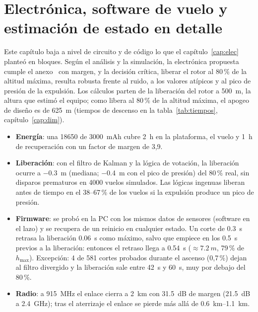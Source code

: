 \chapter[Electrónica y software de vuelo en detalle]{Electrónica, software de vuelo y estimación de estado en detalle}\label{cap:electronica}

Este capítulo baja a nivel de circuito y de código lo que el capítulo~\ref{cap:elec} planteó
en bloques. Según el análisis y la simulación, la electrónica propuesta cumple el
anexo~\cite{anexo} con margen, y la decisión crítica, liberar el rotor al 80\,\% de la
altitud máxima, resulta robusta frente al ruido, a los valores atípicos y al pico de presión
de la expulsión. Los cálculos parten de la liberación del rotor a \SI{500}{m}, la altura que
estimó el equipo; como  libera al 80\,\% de la altitud máxima, el apogeo de diseño es
de \SI{625}{m} (tiempos de descenso en la tabla~\ref{tab:tiempos}, capítulo~\ref{cap:dim}).

\begin{resultado}
\begin{itemize}[leftmargin=*]
  \item \textbf{Energía}: una 18650 de \SI{3000}{mAh} cubre \SI{2}{h} en la plataforma,
        el vuelo y \SI{1}{h} de recuperación con un factor de margen de 3,9.
  \item \textbf{Liberación}: con el filtro de Kalman y la lógica de votación, la liberación
        ocurre a \SI{-0.3}{m} (mediana; \SI{-0.4}{m} con el pico de presión) del 80\,\% real,
        sin disparos prematuros en \num{4000} vuelos simulados. Las lógicas ingenuas liberan
        antes de tiempo en el 38--67\,\% de los vuelos si la expulsión produce un pico de
        presión.
  \item \textbf{Firmware}: se probó en la PC con los mismos datos de sensores (software en el
        lazo) y se recupera de un reinicio en cualquier estado. Un corte de \SI{0.3}{s}
        retrasa la liberación \SI{0.06}{s} como máximo, salvo que empiece en los
        \SI{0.5}{s} previos a la liberación: entonces el retraso llega a \SI{0.54}{s}
        ($\approx\SI{7.2}{m}$, 79\,\% de $h_{\max}$). Excepción: 4 de 581 cortes probados
        durante el ascenso (0,7\,\%) dejan al filtro divergido y la liberación sale entre
        \SI{42}{s} y \SI{60}{s}, muy por debajo del 80\,\%.
  \item \textbf{Radio}: a \SI{915}{MHz} el enlace cierra a \SI{2}{km} con
        \SI{31.5}{dB} de margen (\SI{21.5}{dB} a \SI{2.4}{GHz}); tras el aterrizaje el
        enlace se pierde más allá de \SIrange{0.6}{1.1}{km}.
\end{itemize}
\end{resultado}

